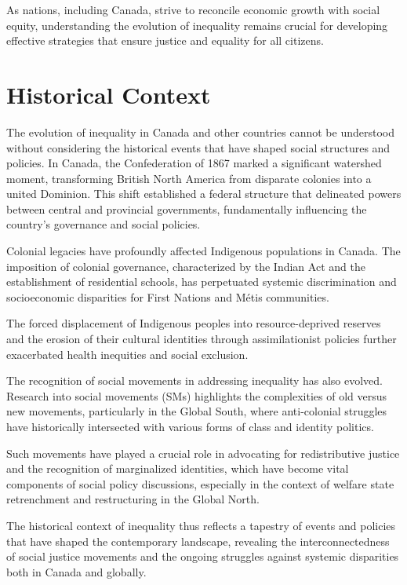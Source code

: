 \documentclass[12pt]{article}
\begin{document}
As nations, including Canada, strive to reconcile economic growth with social equity, understanding the evolution of inequality remains crucial for developing effective strategies that ensure justice and equality for all citizens.

\section*{Historical Context}

The evolution of inequality in Canada and other countries cannot be understood without considering the historical events that have shaped social structures and policies. In Canada, the Confederation of 1867 marked a significant watershed moment, transforming British North America from disparate colonies into a united Dominion. This shift established a federal structure that delineated powers between central and provincial governments, fundamentally influencing the country's governance and social policies.

Colonial legacies have profoundly affected Indigenous populations in Canada. The imposition of colonial governance, characterized by the Indian Act and the establishment of residential schools, has perpetuated systemic discrimination and socioeconomic disparities for First Nations and Métis communities.

The forced displacement of Indigenous peoples into resource-deprived reserves and the erosion of their cultural identities through assimilationist policies further exacerbated health inequities and social exclusion.

The recognition of social movements in addressing inequality has also evolved. Research into social movements (SMs) highlights the complexities of old versus new movements, particularly in the Global South, where anti-colonial struggles have historically intersected with various forms of class and identity politics.

Such movements have played a crucial role in advocating for redistributive justice and the recognition of marginalized identities, which have become vital components of social policy discussions, especially in the context of welfare state retrenchment and restructuring in the Global North.

The historical context of inequality thus reflects a tapestry of events and policies that have shaped the contemporary landscape, revealing the interconnectedness of social justice movements and the ongoing struggles against systemic disparities both in Canada and globally.
\end{document}
